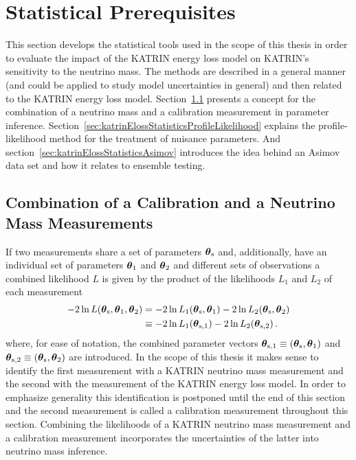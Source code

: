 \def\currentRootFolder{chapter/sensitivityStudyWithPreliminaryKatrinElossModel/statisticalPrerequisites}
\def\currentFigureFolder{\currentRootFolder/fig}



\section{Statistical Prerequisites}
\label{sec:katrinElossStatistics}
This section develops the statistical tools used in the scope of this thesis in order to evaluate the impact of the KATRIN energy loss model on KATRIN's sensitivity to the neutrino mass. The methods are described in a general manner (and could be applied to study model uncertainties in general) and then related to the KATRIN energy loss model. Section~\ref{sec:katrinElossStatisticsCombMeasurements} presents a concept for the combination of a neutrino mass and a calibration measurement in parameter inference. Section~\ref{sec:katrinElossStatisticsProfileLikelihood} explains the profile-likelihood method for the treatment of nuisance parameters. And section~\ref{sec:katrinElossStatisticsAsimov} introduces the idea behind an Asimov data set and how it relates to ensemble testing.

\subsection{Combination of a Calibration and a Neutrino Mass Measurements}
\label{sec:katrinElossStatisticsCombMeasurements}
If two measurements share a set of parameters $\boldsymbol{\mathbf{\theta}}_\mathrm{s}$ and, additionally, have an individual set of parameters $\boldsymbol{\mathbf{\theta}}_1$ and $\boldsymbol{\mathbf{\theta}}_2$ and different sets of observations a combined likelihood $L$ is given by the product of the likelihoods $L_1$ and $L_2$ of each measurement~\cite{ReviewOfParticlePhysics}
\newcommand{\paramVecSOne}{\paramVec_\mathrm{s,1}}
\newcommand{\paramVecSTwo}{\paramVec_\mathrm{s,2}}
\begin{align}
-2\ln L(\paramVecShared, \paramVec_1, \paramVec_2) &=  
-2\ln L_1(\paramVecShared, \paramVec_1)
-2\ln L_2(\paramVecShared, \paramVec_2)
\nonumber \\
&\equiv
-2\ln L_1(\paramVecSOne)
-2\ln L_2(\paramVecSTwo)
\label{eq:katrinElossStatisticsCombinedLikelihood}
\fullstop
\end{align}
where, for ease of notation, the combined parameter vectors $\boldsymbol{\mathbf{\theta}}_\mathrm{s,1}\equiv(\boldsymbol{\mathbf{\theta}}_\mathrm{s},\boldsymbol{\mathbf{\theta}}_1)$ and 
$\boldsymbol{\mathbf{\theta}}_\mathrm{s,2}\equiv(\boldsymbol{\mathbf{\theta}}_\mathrm{s},\boldsymbol{\mathbf{\theta}}_2)$ are introduced. In the scope of this thesis it makes sense to identify the first measurement with a KATRIN neutrino mass measurement and the second with the measurement of the KATRIN energy loss model. In order to emphasize generality this identification is postponed until the end of this section and the second measurement is called a calibration measurement throughout this section. Combining the likelihoods of a KATRIN neutrino mass measurement and a calibration measurement incorporates the uncertainties of the latter into neutrino mass inference. 

